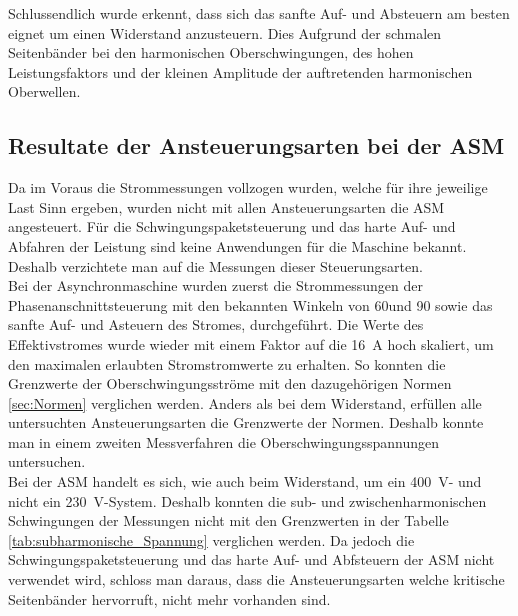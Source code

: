 Schlussendlich wurde erkennt, dass sich das sanfte Auf- und Absteuern am besten eignet um einen Widerstand anzusteuern. Dies Aufgrund der schmalen Seitenbänder bei den harmonischen Oberschwingungen, des hohen Leistungsfaktors und der kleinen Amplitude der auftretenden harmonischen Oberwellen. 

\subsection{Resultate der Ansteuerungsarten bei der ASM}
Da im Voraus die Strommessungen vollzogen wurden, welche für ihre jeweilige Last Sinn ergeben, wurden nicht mit allen Ansteuerungsarten die ASM angesteuert. Für die Schwingungspaketsteuerung und das harte Auf- und Abfahren der Leistung sind keine Anwendungen für die Maschine bekannt. Deshalb verzichtete man auf die Messungen dieser Steuerungsarten.\\

Bei der Asynchronmaschine wurden zuerst die Strommessungen der Phasenanschnittsteuerung mit den bekannten Winkeln von 60\textdegree und 90\textdegree \hspace{0.02cm} sowie das sanfte Auf- und Asteuern des Stromes, durchgeführt. Die Werte des Effektivstromes wurde wieder mit einem Faktor auf die \SI{16}{A} hoch skaliert, um den maximalen erlaubten Stromstromwerte zu erhalten. So konnten die Grenzwerte der Oberschwingungsströme mit den dazugehörigen Normen \ref{sec:Normen} verglichen werden. Anders als bei dem Widerstand, erfüllen alle untersuchten Ansteuerungsarten die Grenzwerte der Normen. Deshalb konnte man in einem zweiten Messverfahren die Oberschwingungsspannungen untersuchen.\\

Bei der ASM handelt es sich, wie auch beim Widerstand, um ein \SI{400}{V}- und nicht ein \SI{230}{V}-System. Deshalb konnten die sub- und zwischenharmonischen Schwingungen der Messungen nicht mit den Grenzwerten in der Tabelle \ref{tab:subharmonische_Spannung} verglichen werden.
Da jedoch die Schwingungspaketsteuerung und das harte Auf- und Abfsteuern der ASM nicht verwendet wird, schloss man daraus, dass die Ansteuerungsarten welche kritische Seitenbänder hervorruft, nicht mehr vorhanden sind. 


